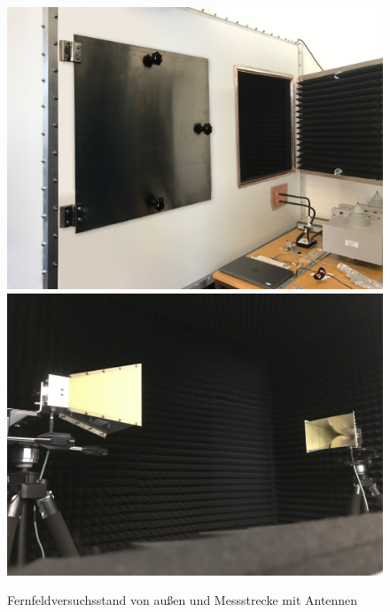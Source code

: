 \begin{figure}[ht]
    \centering
    \includegraphics[height=.22\textheight, draft = false]{Abbildungen/Kapitel3/IMG_5467_bearbeitet.jpg}
    \hspace*{1cm}
    \includegraphics[height=.22\textheight, draft = false]{Abbildungen/Kapitel3/IMG_5472.jpg}
    \caption[Fernfeldversuchsstand von außen und Messstrecke]{Fernfeldversuchsstand von außen und Messstrecke mit Antennen}
    \label{fig:3_Gesamtversuchsstand}
\end{figure}



